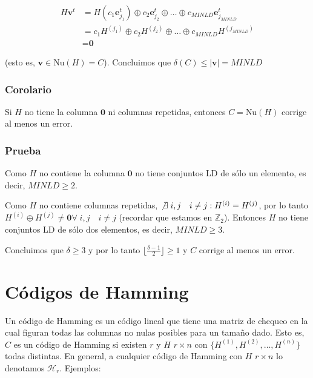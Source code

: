 \documentclass[10pt,a4paper]{article}
\begin{document}
\begin{center}
\begin{align*} H\textbf{v}^t &= H(c_1\textbf{e}_{j_1}^t) \oplus c_2\textbf{e}_{j_2}^t \oplus \dots \oplus c_{MINLD}\textbf{e}_{j_{MINLD}}^t\\ &= c_1H^{(j_1)}\oplus c_2H^{(j_2)}\oplus\dots \oplus c_{MINLD}H^{(j_{MINLD})}\\ &= \textbf{0} \end{align*}
\end{center}

(esto es, $\textbf{v}\in \text{Nu}(H)=C$). Concluimos que $\delta(C) \leq |\textbf{v}|=MINLD$

\subsubsection*{Corolario}

Si $H$ no tiene la columna $\textbf{0}$ ni columnas repetidas, entonces $C = \text{Nu}(H)$ corrige al menos un error.

\subsubsection*{Prueba}

Como $H$ no contiene la columna $\textbf{0}$ no tiene conjuntos LD de sólo un elemento, es decir, $MINLD \geq 2$.

Como $H$ no contiene columnas repetidas, $\not \exists\;i,j \quad i\neq j : H^{(i)} = H^{(j)}$, por lo tanto $H^{(i)} \oplus H^{(j)} \neq \textbf{0} \forall \; i, j \quad i\neq j$ (recordar que estamos en $\mathbb{Z}_2$). Entonces $H$ no tiene conjuntos LD de sólo dos elementos, es decir, $MINLD \geq 3$.

Concluimos que $\delta \geq 3$ y por lo tanto $\lfloor \frac{\delta - 1 }{2}\rfloor \geq 1$ y $C$ corrige al menos un error.

\section*{Códigos de Hamming}

Un código de Hamming es un código lineal que tiene una matriz de chequeo en la cual figuran todas las columnas no nulas posibles para un tamaño dado. Esto es, $C$ es un código de Hamming si existen $r$ y $H$ $r \times n$ con $\{H^{(1)},H^{(2)}, \dots, H^{(n)} \}$ todas distintas. En general, a cualquier código de Hamming con $H$ $r \times n$ lo denotamos $\mathcal{H}_r$. Ejemplos:
\end{document}
